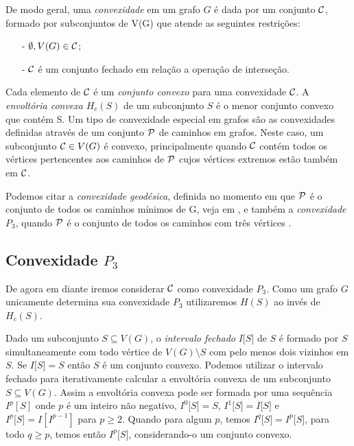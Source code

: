 De modo geral, uma \textit{convexidade} em um grafo $G$ é dada por um conjunto ${\cal C}$, formado por subconjuntos de V(G) que atende as seguintes restrições:
\begin{itemize}
    \item[-] $\emptyset,V(G) \in {\cal C}$;
    \item[-] ${\cal C}$ é um conjunto fechado em relação a operação de interseção.
\end{itemize}
    Cada elemento de ${\cal C}$ é um \textit{conjunto convexo}
para uma convexidade ${\cal C}$. A \textit{envoltória convexa} $H_c(S)$ 
de um subconjunto $S$ é o menor conjunto convexo que contém S.
Um tipo de convexidade especial em grafos são as convexidades definidas através de um conjunto
${\cal P}$ de caminhos em grafos. Neste caso, um subconjunto ${\cal C} \in V(G)$ é convexo, principalmente
quando ${\cal C}$ contém todos os vértices pertencentes aos caminhos de ${\cal P}$ cujos vértices extremos estão também em ${\cal C}$. 

Podemos citar a \textit{convexidade geodésica},
definida no momento em que ${\cal P}$ é o conjunto de todos os caminhos mínimos de G, 
veja em \cite{Caceres2006,Dourado2016,Journal2010}, e também a \textit{convexidade $P_3$},
quando ${\cal P}$ é o conjunto de todos os caminhos com três vértices 
\cite{Barbosa2012,Centeno,Centeno2011,Coelho2014,Dourado2013}.

\subsection{Convexidade $P_3$}
\label{sec-convexidade-p3}
    De agora em diante iremos considerar ${\cal C}$ como convexidade $P_3$.
Como um grafo $G$ unicamente determina sua convexidade $P_3$ utilizaremos
$H(S)$ ao invés de $H_c(S)$.

Dado um subconjunto $S \subseteq V(G)$, o \textit{intervalo fechado} 
$I{[}S{]}$ de $S$ é formado por $S$ simultaneamente com todo vértice de $V(G) \setminus S$
com pelo menos dois vizinhos em $S$. Se $I{[}S{]}=S$ então $S$ é um conjunto convexo.
Podemos utilizar o intervalo fechado para iterativamente calcular a envoltória convexa de 
um subconjunto $S \subseteq V(G)$. Assim a envoltória convexa pode ser formada
por uma sequência $I^p[S]$ onde $p$ é um inteiro não negativo,  
$I^0{[}S{]}=S$, $I^1{[}S{]}=I{[}S{]}$ e $I^p{[}S{]}=I[I^{p-1}]$ para $p \ge 2$.
Quando para algum $p$, temos $I^q{[}S{]} = I^p{[}S{]}$, para todo $q \ge p$, temos
então $I^p{[}S{]}$, considerando-o  um conjunto convexo.

